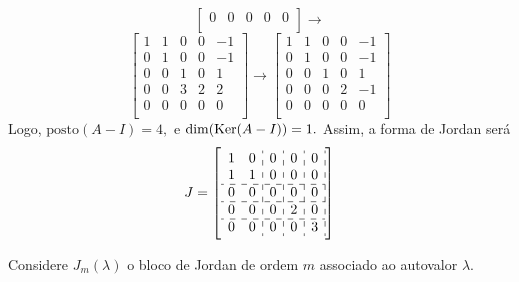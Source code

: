 \documentclass[11pt,a4paper]{article}
\begin{document}
{{\[\begin{bmatrix}
0 & 0 & 0& 0 & 0\\
\end{bmatrix}\rightarrow\]\[
\begin{bmatrix}
1 & 1 & 0& 0& -1\\
0 & 1 & 0& 0 & -1\\
0 & 0 & 1& 0 & 1\\
0 & 0 & 3& 2& 2\\
0 & 0 & 0& 0 & 0\\
\end{bmatrix}\rightarrow
\begin{bmatrix}
1 & 1 & 0& 0& -1\\
0 & 1 & 0& 0 & -1\\
0 & 0 & 1& 0 & 1\\
0 & 0 & 0& 2& -1\\
0 & 0 & 0& 0 & 0\\
\end{bmatrix}
\]
Logo, $\mbox{posto}(A-I) = 4,$ e $\dim(\operatorname{Ker}(A-I)) = 1.$ Assim, a forma de Jordan será
\[
J= \left[\begin{array}{cc:c:c:c:c}
1 & 0 & 0 & 0 & 0  \\
1 & 1 & 0 & 0 & 0  \\ \hdashline
0 & 0 & 0 & 0 & 0  \\ \hdashline
0 & 0 & 0 & 2 & 0  \\ \hdashline
0 & 0 & 0 & 0 & 3 \\
\end{array}\right]
\]
}
}
\begin{exercicio}
Considere $J_m(\lambda)$ o bloco de Jordan de ordem $m$ associado ao autovalor $\lambda.$%
\end{exercicio}
\solucao{}
\end{document}
